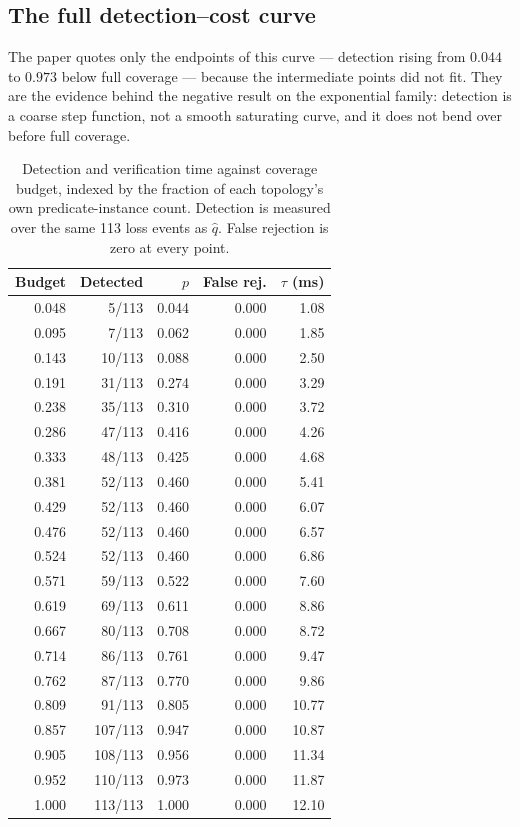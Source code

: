 \subsection{The full detection--cost curve}
\label{supp:pcurve}

The paper quotes only the endpoints of this curve --- detection rising from
$0.044$ to $0.973$ below full coverage --- because the intermediate points
did not fit. They are the evidence behind the negative result on the
exponential family: detection is a coarse step function, not a smooth
saturating curve, and it does not bend over before full coverage.

\begin{table}[h]
\centering
\caption{Detection and verification time against coverage budget, indexed by
the fraction of each topology's own predicate-instance count. Detection is
measured over the same 113 loss events as $\hat q$. False rejection is zero
at every point.}
\label{tab:supp-pcurve}
\footnotesize
\begin{tabular}{rrrrr}
\toprule
Budget & Detected & $p$ & False rej. & $\tau$ (ms)\\
\midrule
0.048 & 5/113 & 0.044 & 0.000 & 1.08 \\
0.095 & 7/113 & 0.062 & 0.000 & 1.85 \\
0.143 & 10/113 & 0.088 & 0.000 & 2.50 \\
0.191 & 31/113 & 0.274 & 0.000 & 3.29 \\
0.238 & 35/113 & 0.310 & 0.000 & 3.72 \\
0.286 & 47/113 & 0.416 & 0.000 & 4.26 \\
0.333 & 48/113 & 0.425 & 0.000 & 4.68 \\
0.381 & 52/113 & 0.460 & 0.000 & 5.41 \\
0.429 & 52/113 & 0.460 & 0.000 & 6.07 \\
0.476 & 52/113 & 0.460 & 0.000 & 6.57 \\
0.524 & 52/113 & 0.460 & 0.000 & 6.86 \\
0.571 & 59/113 & 0.522 & 0.000 & 7.60 \\
0.619 & 69/113 & 0.611 & 0.000 & 8.86 \\
0.667 & 80/113 & 0.708 & 0.000 & 8.72 \\
0.714 & 86/113 & 0.761 & 0.000 & 9.47 \\
0.762 & 87/113 & 0.770 & 0.000 & 9.86 \\
0.809 & 91/113 & 0.805 & 0.000 & 10.77 \\
0.857 & 107/113 & 0.947 & 0.000 & 10.87 \\
0.905 & 108/113 & 0.956 & 0.000 & 11.34 \\
0.952 & 110/113 & 0.973 & 0.000 & 11.87 \\
1.000 & 113/113 & 1.000 & 0.000 & 12.10 \\
\bottomrule
\end{tabular}
\end{table}


